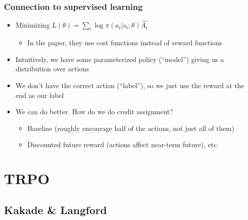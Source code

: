 \documentclass{beamer}
\begin{document}
\begin{frame}
  \frametitle{Connection to supervised learning}
  \begin{itemize}
    \item Minimizing $L(\theta) = \sum_t \log \pi(a_t | s_t ; \theta) \hat{A_t}$
      \begin{itemize}
        \item In the paper, they use cost functions instead of reward functions
      \end{itemize}
    \item Intuitively, we have some parameterized policy (``model'') giving us a distribution over actions
    \item We don't have the correct action (``label''), so we just use the reward at the end as our label
    \item We can do better. How do we do credit assignment?
      \begin{itemize}
        \item Baseline (roughly encourage half of the actions, not just all of them)
        \item Discounted future reward (actions affect near-term future), etc.
      \end{itemize}
  \end{itemize}
\end{frame}

\section{TRPO}

\subsection{Kakade \& Langford}
\end{document}
